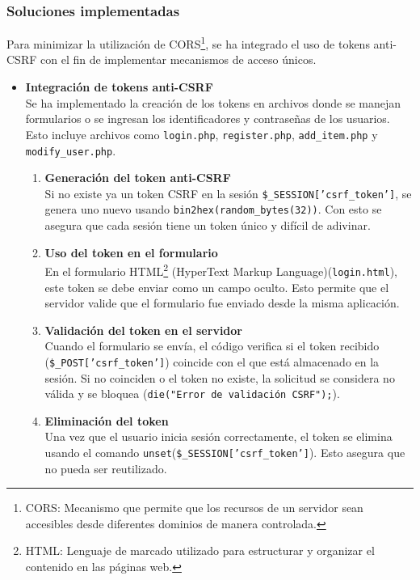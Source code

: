 \documentclass[a4paper,12pt]{article}
\newcommand{\code}[1]{\texttt{#1}}  %
\begin{document}
\subsubsection{Soluciones implementadas}
Para minimizar la utilización de CORS\footnote{CORS: Mecanismo que permite que los recursos de un servidor sean accesibles desde diferentes dominios de manera controlada.}, se ha integrado el uso de tokens anti-CSRF con el fin de implementar mecanismos de acceso únicos.\\
\begin{itemize}
	\item \textbf{Integración de tokens anti-CSRF\\} Se ha implementado la creación de los tokens en archivos donde se manejan formularios o se ingresan los identificadores y contraseñas de los usuarios. Esto incluye archivos como \code{login.php}, \code{register.php}, \code{add\_item.php} y \code{modify\_user.php}.
	\begin{enumerate}
		\item \textbf{Generación del token anti-CSRF\\} Si no existe ya un token CSRF en la sesión \code{\$\_SESSION['csrf\_token']}, se genera uno nuevo usando \code{bin2hex(random\_bytes(32))}. Con esto se asegura que cada sesión tiene un token único y difícil de adivinar.
		\item \textbf{Uso del token en el formulario\\} En el formulario HTML\footnote{HTML: Lenguaje de marcado utilizado para estructurar y organizar el contenido en las páginas web.} (HyperText Markup Language)(\code{login.html}), este token se debe enviar como un campo oculto. Esto permite que el servidor valide que el formulario fue enviado desde la misma aplicación.
		\item \textbf{Validación del token en el servidor\\} Cuando el formulario se envía, el código verifica si el token recibido \\ (\code{\$\_POST['csrf\_token']}) coincide con el que está almacenado en la sesión. Si no coinciden o el token no existe, la solicitud se considera no válida y se bloquea (\code{die("Error de validación CSRF");}).
		\item \textbf{Eliminación del token\\}Una vez que el usuario inicia sesión correctamente, el token se elimina usando el comando \code{unset}(\code{\$\_SESSION['csrf\_token']}). Esto asegura que no pueda ser reutilizado.
	\end{enumerate}

\end{itemize}
\end{document}
